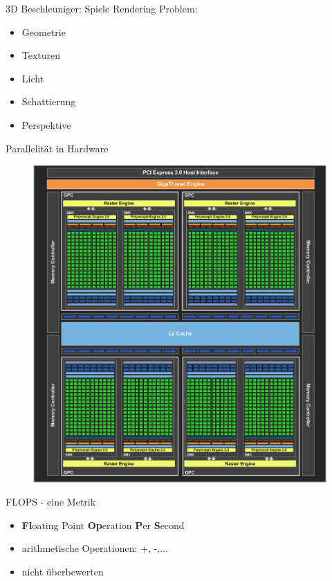 \documentclass[10pt,aspectratio=169]{beamer}
\begin{document}
\begin{frame}{3D Beschleuniger: Spiele}
  Rendering Problem: 

  \begin{itemize}
      \item Geometrie
      \item Texturen
      \item Licht
      \item Schattierung
      \item Perspektive
  \end{itemize}
\end{frame}

\begin{frame}{Parallelit\"at in Hardware}
    \begin{figure}[ht]
        \begin{center}
            \includegraphics[height=0.8\textheight]{nvidia-pascal.png}
        \end{center}
    \end{figure}
\end{frame}

\begin{frame}{FLOPS - eine Metrik}
    \begin{itemize}
        \item \textbf{Fl}oating Point \textbf{Op}eration \textbf{P}er \textbf{S}econd 
        \item arithmetische Operationen: +, -,...
        \item nicht überbewerten
    \end{itemize}
\end{frame}
\end{document}
